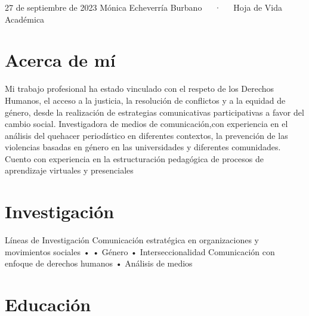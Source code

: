 \documentclass[11pt,a4paper,]{awesome-cv}
\begin{document}
\makecvheader

\makecvfooter
  {27 de septiembre de 2023}
    {Mónica Echeverría Burbano~~~·~~~Hoja de Vida Académica}
  {\thepage}





\hypertarget{acerca-de-muxed}{%
\section{Acerca de mí}\label{acerca-de-muxed}}

Mi trabajo profesional ha estado vinculado con el respeto de los
Derechos Humanos, el acceso a la justicia, la resolución de conflictos y
a la equidad de género, desde la realización de estrategias
comunicativas participativas a favor del cambio social. Investigadora de
medios de comunicación,con experiencia en el análisis del quehacer
periodístico en diferentes contextos, la prevención de las violencias
basadas en género en las universidades y diferentes comunidades. Cuento
con experiencia en la estructuración pedagógica de procesos de
aprendizaje virtuales y presenciales

\hypertarget{investigaciuxf3n}{%
\section{Investigación}\label{investigaciuxf3n}}

\begin{cvskills}
  \cvskill
    {Líneas de Investigación}
    {Comunicación estratégica en organizaciones y movimientos sociales •  • Género • Interseccionalidad \newline
    Comunicación con enfoque de derechos humanos • Análisis de medios}
\end{cvskills}

\hypertarget{educaciuxf3n}{%
\section{Educación}\label{educaciuxf3n}}
\end{document}
